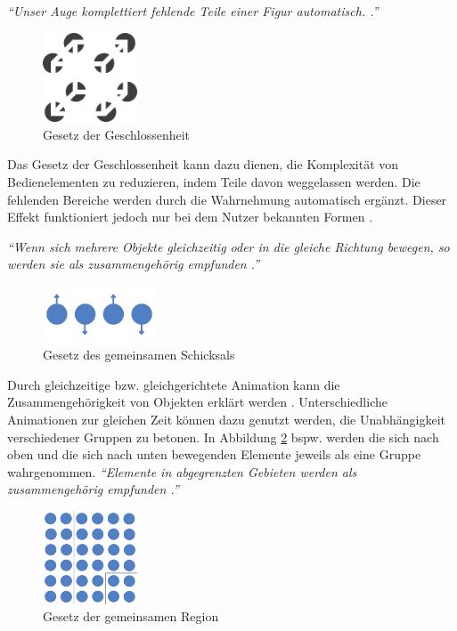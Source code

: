 \textit{\enquote{Unser Auge komplettiert fehlende Teile einer Figur automatisch. \cite[S. 187]{Moser2012}.}}\par
\begin{figure}[H]
 \centering
 \includegraphics[width=0.25\textwidth]{grafiken/geschlossenheit.png}
 \caption{Gesetz der Geschlossenheit \cite{WikiGestaltgesetze}}
 \label{fig:gesetzGeschloss}
\end{figure}
Das Gesetz der Geschlossenheit kann dazu dienen, die Komplexität von Bedienelementen zu reduzieren, indem Teile davon weggelassen werden. Die fehlenden Bereiche werden durch die Wahrnehmung automatisch ergänzt. Dieser Effekt funktioniert jedoch nur bei dem Nutzer bekannten Formen \cite{Moser2012}.\par
{}
\textit{\enquote{Wenn sich mehrere Objekte gleichzeitig oder in die gleiche Richtung bewegen, so werden sie als zusammengehörig empfunden \cite[S. 187]{Moser2012}.}}\par
\begin{figure}[H]
 \centering
 \includegraphics[width=0.2999\textwidth]{grafiken/schicksal.png}
 \caption{Gesetz des gemeinsamen Schicksals}
 \label{fig:gesetzSchicksal}
\end{figure}
Durch gleichzeitige bzw. gleichgerichtete Animation kann die Zusammengehörigkeit von Objekten erklärt werden \cite{Moser2012}. Unterschiedliche Animationen zur gleichen Zeit können dazu genutzt werden, die Unabhängigkeit verschiedener Gruppen zu betonen. In Abbildung \ref{fig:gesetzSchicksal} bspw. werden die sich nach oben und die sich nach unten bewegenden Elemente jeweils als eine Gruppe wahrgenommen.
\textit{\enquote{Elemente in abgegrenzten Gebieten werden als zusammengehörig empfunden \cite{WikiGestaltgesetze}.}}\par
\begin{figure}[H]
 \centering
 \includegraphics[width=0.25\textwidth]{grafiken/region.png}
 \caption{Gesetz der gemeinsamen Region}
 \label{fig:gesetzRegion}
\end{figure}
